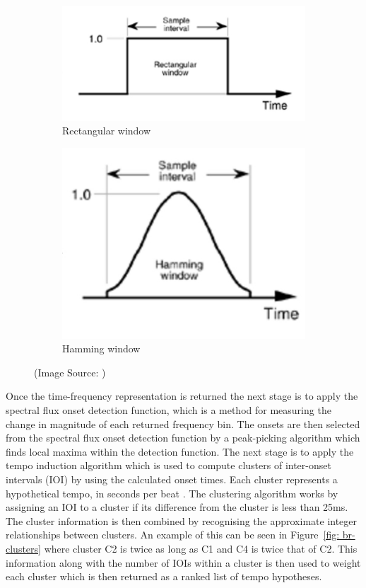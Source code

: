 \documentclass[a4paper, 11pt]{article}
\begin{document}
\begin{figure}[ht]
\centering
\begin{subfigure}{.5\textwidth}
  \centering
  \includegraphics[width=0.6\linewidth]{images/rectangWin.jpg}
  \caption{Rectangular window}
  \label{fig: rectan}
\end{subfigure}%
\begin{subfigure}{.5\textwidth}
  \centering
  \includegraphics[width=0.6\linewidth]{images/hamming.jpg}
  \caption{Hamming window}
  \label{fig: hamWin}
\end{subfigure}
\caption{(Image Source: \cite{lyons})}
\label{fig: Wins}
\end{figure}


Once the time-frequency representation is returned the next stage is to apply the spectral flux onset detection function, which is a method for measuring the change in magnitude of each returned frequency bin\cite{dixon2}. The onsets are then selected from the spectral flux onset detection function by a peak-picking algorithm which finds local maxima within the detection function. The next stage is to apply the tempo induction algorithm which is used to compute clusters of inter-onset intervals (IOI) by using the calculated onset times. Each cluster represents a hypothetical tempo, in seconds per beat \cite{dixon1}. The clustering algorithm works by assigning an IOI to a cluster if its difference from the cluster is less than 25ms. The cluster information is then combined by recognising the approximate integer relationships between clusters. An example of this can be seen in Figure~\ref{fig: br-clusters} where cluster C2 is twice as long as C1 and C4 is twice that of C2. This information along with the number of IOIs within a cluster is then used to weight each cluster which is then returned as a ranked list of tempo hypotheses\cite{dixon4}.
\end{document}
